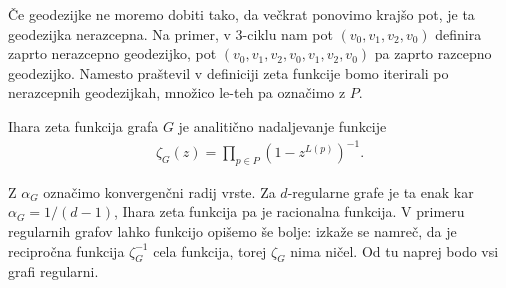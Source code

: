 Če geodezijke ne moremo dobiti tako, da večkrat ponovimo krajšo pot, je ta geodezijka nerazcepna. Na primer, v 3-ciklu nam pot \((v_0, v_1, v_2, v_0)\) definira zaprto nerazcepno geodezijko, pot \((v_0, v_1, v_2, v_0, v_1, v_2, v_0)\) pa zaprto razcepno geodezijko. Namesto praštevil v definiciji zeta funkcije bomo iterirali po nerazcepnih geodezijkah, množico le-teh pa označimo z \(P\).

\begin{definicija}
    Ihara zeta funkcija grafa \(G\) je analitično nadaljevanje funkcije
    \begin{align*}
        \zeta_G(z) = \prod_{p\in P}\left(1-z^{L(p)}\right)^{-1}.
    \end{align*}
\end{definicija}
 
Z \(\alpha_G\) označimo konvergenčni radij vrste. Za \(d\)-regularne grafe je ta enak kar \(\alpha_G = 1/(d-1)\), Ihara zeta funkcija pa je racionalna funkcija. V primeru regularnih grafov lahko funkcijo opišemo še bolje: izkaže se namreč, da je recipročna funkcija \(\zeta_G^{-1}\) cela funkcija, torej \(\zeta_G\) nima ničel. Od tu naprej bodo vsi grafi regularni.

